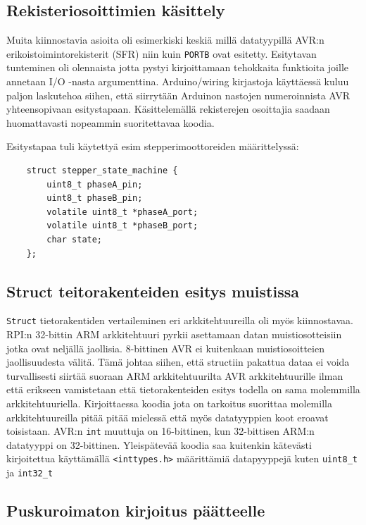 \documentclass[]{article} %
\numberwithin{equation}{section}
\numberwithin{figure}{section}
\numberwithin{table}{section}
\begin{document}
\subsection{Rekisteriosoittimien käsittely}
\label{Rekisteriosoittimien kasittely}

Muita kiinnostavia asioita oli esimerkiski keskiä millä datatyypillä AVR:n erikoistoimintorekisterit (SFR) niin kuin \verb+PORTB+ ovat esitetty.
Esitytavan tunteminen oli olennaista jotta pystyi kirjoittamaan tehokkaita funktioita joille annetaan I/O -nasta argumenttina. Arduino/wiring kirjastoja käyttäessä kuluu paljon laskutehoa siihen, että siirrytään Arduinon nastojen numeroinnista AVR yhteensopivaan esitystapaan. Käsittelemällä rekisterejen osoittajia saadaan huomattavasti nopeammin suoritettavaa koodia.

Esitystapaa tuli käytettyä esim stepperimoottoreiden määrittelyssä:

\begin{verbatim}
    struct stepper_state_machine {
        uint8_t phaseA_pin;
        uint8_t phaseB_pin;
        volatile uint8_t *phaseA_port;
        volatile uint8_t *phaseB_port;
        char state;
    };
\end{verbatim}

\subsection{Struct teitorakenteiden esitys muistissa}

\verb+Struct+ tietorakentiden vertaileminen eri arkkitehtuureilla oli myös kiinnostavaa.
RPI:n 32-bittin ARM arkkitehtuuri pyrkii asettamaan datan muistiosotteisiin jotka ovat neljällä jaollisia. 8-bittinen AVR ei kuitenkaan muistiosoitteien jaollisuudesta välitä.
Tämä johtaa siihen, että structiin pakattua dataa ei voida turvallisesti siirtää suoraan ARM arkkitehtuurilta AVR arkkitehtuurille ilman että erikseen vamistetaan että tietorakenteiden esitys todella on sama molemmilla arkkitehtuuriella.
Kirjoittaessa koodia jota on tarkoitus suorittaa molemilla arkkitehtuureilla pitää pitää mielessä että myös datatyyppien koot eroavat toisistaan. AVR:n \verb+int+ muuttuja on 16-bittinen, kun 32-bittisen ARM:n datatyyppi on 32-bittinen.
Yleispätevää koodia saa kuitenkin kätevästi kirjoitettua käyttämällä \verb+<inttypes.h>+ määrittämiä datapyyppejä kuten \verb+uint8_t+ ja \verb+int32_t+

\subsection{Puskuroimaton kirjoitus päätteelle}
\label{sub:Puskuroimaton kirjoitus paatteelle}
\end{document}

